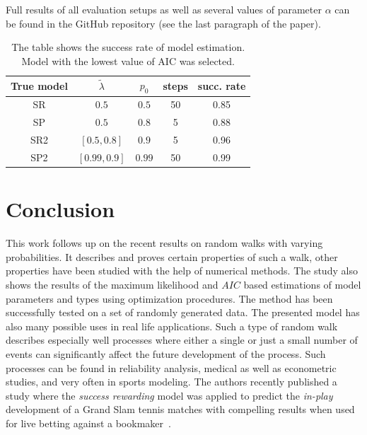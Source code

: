 \documentclass{amsart}
\theoremstyle{definition}
\theoremstyle{plain}
\theoremstyle{plain}
\theoremstyle{plain}
\numberwithin{equation}{section}
\begin{document}
    Full results of all {\color{red}evaluation} setups as well as several values of parameter $\alpha$ can be found in the GitHub repository (see the last paragraph of the paper).

    \begin{table}
        \centering{}

        {\caption{\label{tab:Fitting-results-model}The table shows the success {\color{red} rate} of model estimation. Model with the lowest value of AIC was selected.}
            \begin{tabular}{|c|c|c|c|c|}
                \hline
                True model & $\tilde{\lambda}$  & $p_0$  & steps & {\color{red}succ. rate} \tabularnewline
                \hline
                SR & $0.5$  & $0.5$  & 50 & 0.85 \tabularnewline
                \hline
                SP & $0.5$  & $0.8$  & 5 & 0.88 \tabularnewline
                \hline
                SR2 & $[0.5,0.8]$  & $0.9$  & 5 & 0.96 \tabularnewline
                \hline
                SP2 & $[0.99,0.9]$  & $0.99$  & 50 & 0.99 \tabularnewline
                \hline
            \end{tabular}
        }
    \end{table}


    \section{Conclusion\label{sec:Conclusion}}

    This work follows up on the recent results on random walks with varying
    probabilities. It describes and proves certain properties of such
    a walk, other properties have been studied with the help of numerical
    methods. The study also shows the results of the maximum likelihood
    and $AIC$ based estimations of model parameters and types using optimization
    procedures. The method has been successfully tested on a set of randomly
    generated data. The presented model has also many possible uses in
    real life applications. Such a type of random walk describes especially
    well processes where either a single or just a small number of events
    can significantly affect the future development of the process. Such
    processes can be found in reliability analysis, medical as well as
    econometric studies, and very often in sports modeling. The authors
    recently published a study where the \emph{\color{blue}success rewarding} model was applied
    to predict the \emph{in-play} development of a Grand Slam tennis matches
    with compelling results when used for live betting against a bookmaker~\cite{ja2019imam}.
\end{document}

